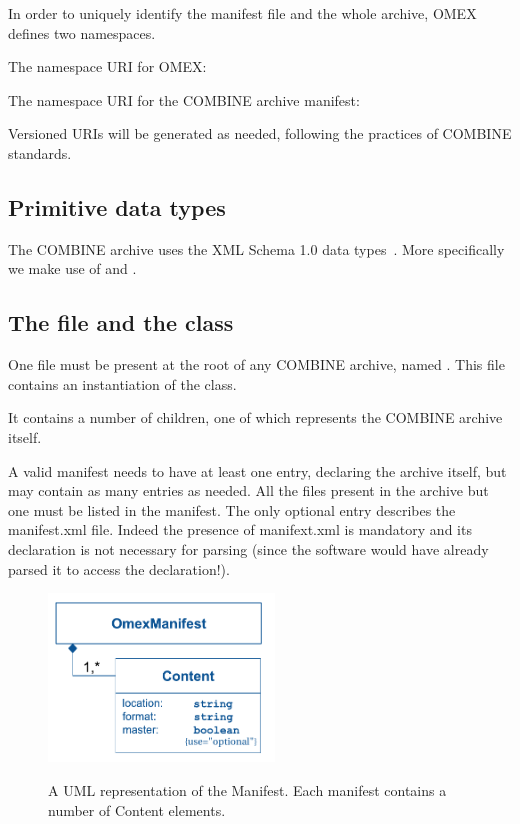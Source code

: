 In order to uniquely identify the manifest file and the whole archive, OMEX defines two namespaces.

The namespace URI for OMEX: 

\begin{quote}
\end{quote}

The namespace URI for the COMBINE archive manifest: 

\begin{quote}
\end{quote}

Versioned URIs will be generated as needed, following the practices of COMBINE standards.


\subsection{Primitive data types}
\label{primtypes}

The COMBINE archive uses the XML Schema 1.0 data types~\citep{biron:2000}.
More specifically we make use of  and .

\subsection{The  file and the  class}
\label{manifest-class}

One file must be present at the root of any COMBINE archive, named . This file contains an instantiation of the \OmexManifest class. 

It contains a number of \Content children, one of which represents the COMBINE archive itself. 

A valid manifest needs to have at least one entry, declaring the archive itself, but may 
contain as many entries as needed. All the files present in the archive but one must be listed in the manifest. The only optional entry describes the manifest.xml file. Indeed the presence of manifext.xml is mandatory and its declaration is not necessary for parsing (since the software would have already parsed it to access the declaration!).

\begin{figure}[h!]
  \centering
  \includegraphics[width=6cm]{images/OmexManifest.pdf}\\
  \caption{A UML representation of the Manifest. Each manifest contains a number of Content elements.}
  \label{fig:combine_uml}
\end{figure}

